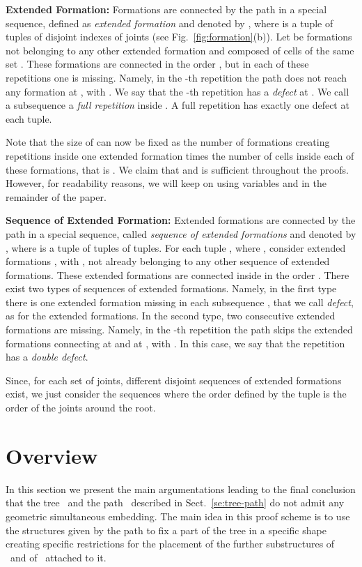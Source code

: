 \documentclass[a4paper,10pt]{llncs}
\newcommand{\T}{\mbox{ }}
\renewcommand{\P}{\mbox{ }}
\begin{document}
{\bf Extended Formation:}
Formations are connected by the path in a special sequence, defined as {\it extended formation} and denoted by , where   is a tuple of tuples of disjoint indexes of joints (see Fig.~\ref{fig:formation}(b)). Let  be  formations  not belonging to any other extended formation and composed of cells of the same set . These formations are connected in the order , but in each of these  repetitions one  is missing. Namely, in the -th repetition the path does not reach any formation at , with . We say that the -th repetition has a {\it defect} at . We call a subsequence  a \emph{full repetition} inside . A full repetition has exactly one defect at each tuple.

Note that the size of  can now be fixed as the number of formations creating repetitions inside one extended formation times the number of cells inside each of these formations, that is . We claim that  and  is sufficient throughout the proofs. However, for readability reasons, we will keep on using variables  and  in the remainder of the paper.

{\bf Sequence of Extended Formation:}
Extended formations are connected by the path in a special sequence, called {\it sequence of extended formations} and denoted by , where  is a tuple of tuples of tuples. For each tuple , where , consider  extended formations , with , not already belonging to any other sequence of extended formations.
These extended formations are connected inside  in the order . There exist two types of sequences of extended formations. Namely, in the first type there is one extended formation missing in each subsequence , that we call \emph{defect}, as for the extended formations. In the second type, two consecutive extended formations are missing. Namely, in the -th repetition the path skips the extended formations connecting at  and at , with . In this case, we say that the repetition has a \emph{double defect}.

Since, for each set of  joints,  different disjoint sequences of extended formations exist, we just consider the sequences where the order defined by the tuple is the order of the joints around the root.

\section{Overview}\label{se:overview}

In this section we present the main argumentations leading to the final conclusion that the tree \T and the path \P described in Sect.~\ref{se:tree-path} do not admit any geometric simultaneous embedding. The main idea in this proof scheme is to use the structures given by the path to fix a part of the tree in a specific shape creating specific restrictions for the placement of the further substructures of \T and of \P attached to it.
\end{document}
